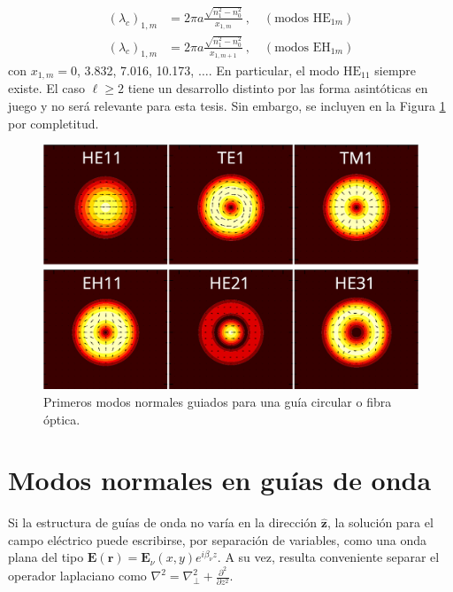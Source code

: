 \begin{align*}
	(\lambda_c)_{1,m} &= 2\pi a \frac{\sqrt{n_1^2 - n_0^2}}{x_{1,m}} \ ,  \quad \left(\text{modos HE}_{1m}\right)
	\\
	(\lambda_c)_{1,m} &= 2\pi a \frac{\sqrt{n_1^2 - n_0^2}}{x_{1,m+1}} \ , \quad \left(\text{modos EH}_{1m}\right)
\end{align*}
con $x_{1,m}=0$, 3.832,  7.016, 10.173, $\dots$.
En particular, el modo $\text{HE}_{11}$ siempre existe. El caso $\ell \ge 2$ tiene un desarrollo distinto por las forma asintóticas en juego y no será relevante para esta tesis. Sin embargo, se incluyen en la Figura \ref{fig:vortices} por completitud.
\begin{figure}[H]
	\includegraphics[width=\linewidth]{media/OAM_analitic}
		\caption{Primeros modos normales guiados para una guía circular o fibra óptica. \label{fig:vortices}}
\end{figure}

\section{Modos normales en guías de onda}

Si la estructura de guías de onda no varía en la dirección \( \hat{\textbf{z}} \), la solución para el campo eléctrico puede escribirse, por separación de variables, como una onda plana del tipo \( \textbf{E}(\textbf{r}) = \textbf{E}_\nu(x, y) e^{i\beta_\nu z} \). A su vez, resulta conveniente separar el operador laplaciano como \( \nabla^2 = \nabla_\perp^2 + \frac{\partial^2}{\partial z^2} \). 

